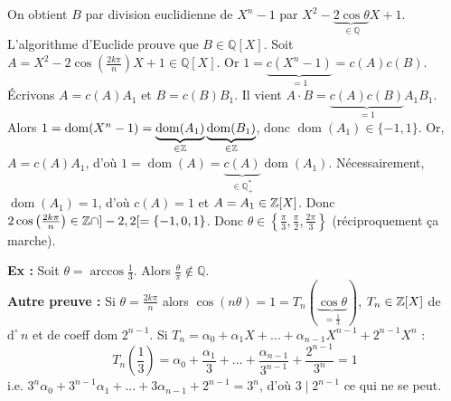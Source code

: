 \begin{solution}
\begin{center}
\end{center}

On obtient $B$ par division euclidienne de $X^n - 1$ par $X^2 - \underbrace{2\cos\theta}_{\in \mathbb{Q}} X + 1$. L'algorithme d'Euclide prouve que $B \in \mathbb{Q}[X]$.
Soit $A = X^2 - 2\cos\left(\frac{2k\pi}{n}\right)X + 1 \in \mathbb{Q}[X]$.
Or $1 = \underbrace{c(X^n - 1)}_{= 1} = c(A) c(B)$.
Écrivons $A = c(A) A_1$ et $B = c(B) B_1$. Il vient $A \cdot B = \underbrace{c(A) c(B)}_{= 1} A_1 B_1$.
Alors $1 = \operatorname{dom}(X^n - 1) = \underbrace{\operatorname{dom}(A_1)}_{\in \mathbb Z} \underbrace{\operatorname{dom}(B_1)}_{\in \mathbb Z}$, donc $\operatorname{dom}(A_1) \in \{-1, 1\}$.
Or, $A = c(A) A_1$, d'où $1 = \operatorname{dom}(A) = \underbrace{c(A)}_{\in \mathbb{Q}_+^*} \operatorname{dom}(A_1)$.
Nécessairement, $\operatorname{dom}(A_1) = 1$, d'où $c(A) = 1$ et $A = A_1 \in \mathbb Z[X]$.
Donc $2\cos\left(\frac{2k\pi}{n}\right) \in \mathbb Z \cap ]-2, 2[ = \{-1, 0, 1\}$.
Donc $\boxed{\theta \in \left\{\frac{\pi}{3}, \frac{\pi}{2}, \frac{2\pi}{3}\right\}}$ (réciproquement ça marche).

\textbf{Ex :} Soit $\theta = \arccos \frac{1}{3}$. Alors $\frac{\theta}{\pi} \notin \mathbb{Q}$. \\
\textbf{Autre preuve :} Si $\theta = \frac{2k\pi}{n}$ alors $\cos(n\theta) = 1 = T_n(\underbrace{\cos\theta}_{= \frac{1}{3}})$, $T_n \in \mathbb Z[X]$ de $\mathrm{d}^\circ \, n$ et de coeff dom $2^{n-1}$.
Si $T_n = \alpha_0 + \alpha_1 X + \dots + \alpha_{n-1} X^{n-1} + 2^{n-1} X^n$ :
\[ T_n\left(\frac{1}{3}\right) = \alpha_0 + \frac{\alpha_1}{3} + \dots + \frac{\alpha_{n-1}}{3^{n-1}} + \frac{2^{n-1}}{3^n} = 1 \]
i.e. $3^n \alpha_0 + 3^{n-1}\alpha_1 + \dots + 3\alpha_{n-1} + 2^{n-1} = 3^n$, d'où $3 \mid 2^{n-1}$ ce qui ne se peut.
\end{solution}



